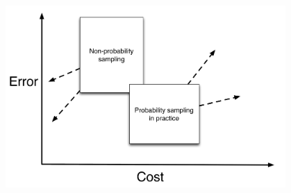 \documentclass[aspectratio=169]{beamer}
\begin{document}
\begin{frame}

\begin{center}
\includegraphics[width=0.8\textwidth]{figures/future_sampling}
\end{center}

\end{frame}
\end{document}
